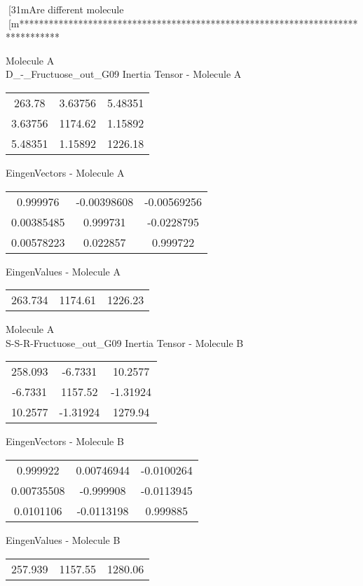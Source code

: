 [31mAre different molecule
[m********************************************************************************
\newpage
\begin{multicols}{2}
\begin{center}
Molecule A \\ 
D_-_Fructuose_out_G09
Inertia Tensor - Molecule A \\
\vtab
\begin{tabular}{|c c c|}
263.78	 & 	3.63756	 & 	5.48351	 \\
3.63756	 & 	1174.62	 & 	1.15892	 \\
5.48351	 & 	1.15892	 & 	1226.18
\end{tabular}

\vtab
 EingenVectors - Molecule A     \\
\vtab
\begin{tabular}{|c c c|}
0.999976	 & 	-0.00398608	 & 	-0.00569256	 \\
0.00385485	 & 	0.999731	 & 	-0.0228795	 \\
0.00578223	 & 	0.022857	 & 	0.999722
\end{tabular}

\vtab
 EingenValues - Molecule A     \\
\vtab
\begin{tabular}{|c c c|}
263.734	 & 	1174.61	 & 	1226.23
\end{tabular}
\columnbreak
Molecule A \\ 
S-S-R-Fructuose_out_G09
Inertia Tensor - Molecule B \\
\vtab
\begin{tabular}{|c c c|}
258.093	 & 	-6.7331	 & 	10.2577	 \\
-6.7331	 & 	1157.52	 & 	-1.31924	 \\
10.2577	 & 	-1.31924	 & 	1279.94
\end{tabular}

\vtab
 EingenVectors - Molecule B     \\
\vtab
\begin{tabular}{|c c c|}
0.999922	 & 	0.00746944	 & 	-0.0100264	 \\
0.00735508	 & 	-0.999908	 & 	-0.0113945	 \\
0.0101106	 & 	-0.0113198	 & 	0.999885
\end{tabular}

\vtab
 EingenValues - Molecule B     \\
\vtab
\begin{tabular}{|c c c|}
257.939	 & 	1157.55	 & 	1280.06
\end{tabular}
\end{center}
\end{multicols}
